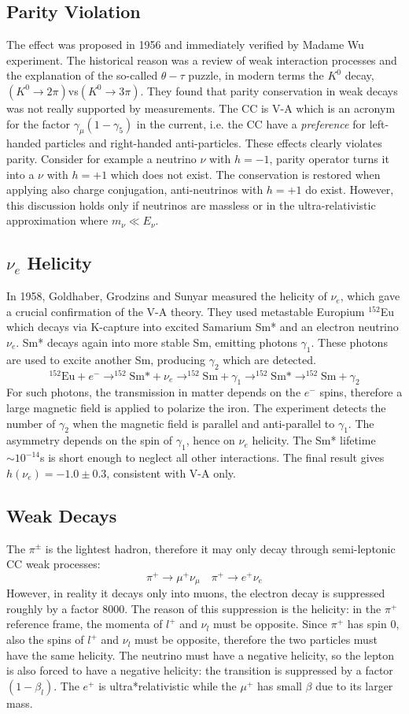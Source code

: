 \documentclass[10.75pt,a4paper,openright,bottom=2cm]{article}
\begin{document}
\subsection{Parity Violation}
The effect was proposed in 1956 and immediately verified by Madame Wu experiment. The historical reason was a review of weak interaction processes and the explanation of the so-called $\theta-\tau$ puzzle, in modern terms the $K^0$ decay,\\
$(K^0\to2\pi)$vs$(K^0\to3\pi)$. They found that parity conservation in weak decays was not really supported by measurements. The CC is V-A which is an acronym for the factor $\gamma_\mu(1-\gamma_5)$ in the current, i.e. the CC have a \textit{preference} for left-handed particles and right-handed anti-particles. These effects clearly violates parity. Consider for example a neutrino $\nu$ with $h=-1$, parity operator turns it into a $\nu$ with $h=+1$ which does not exist. The conservation is restored when applying also charge conjugation, anti-neutrinos with $h=+1$ do exist. However, this discussion holds only if neutrinos are massless or in the ultra-relativistic approximation where $m_\nu\ll E_\nu$.
\subsection{$\nu_e$ Helicity}
In 1958, Goldhaber, Grodzins and Sunyar measured the helicity of $\nu_e$, which gave a crucial confirmation of the V-A theory. They used metastable Europium $^{152}$Eu which decays via K-capture into excited Samarium Sm* and an electron neutrino $\nu_e$. Sm* decays again into more stable Sm, emitting photons $\gamma_1$. These photons are used to excite another Sm, producing $\gamma_2$ which are detected. 
\[
^{152}\text{Eu}+e^-\to^{152}\text{Sm*}+\nu_e\to^{152}\text{Sm}+\gamma_1\to^{152}\text{Sm*}\to^{152}\text{Sm}+\gamma_2
\]
For such photons, the transmission in matter depends on the $e^-$ spins, therefore a large magnetic field is applied to polarize the iron. The experiment detects the number of $\gamma_2$ when the magnetic field is parallel and anti-parallel to $\gamma_1$. The asymmetry depends on the spin of $\gamma_1$, hence on $\nu_e$ helicity. The Sm* lifetime $\sim10^{-14}$\;s is short enough to neglect all other interactions. The final result gives $h(\nu_e)=-1.0\pm0.3$, consistent with V-A only.
\subsection{Weak Decays}
The $\pi^\pm$ is the lightest hadron, therefore it may only decay through semi-leptonic CC weak processes:
\[
\pi^+\to\mu^+\nu_\mu \quad \pi^+\to e^+\nu_e
\]
However, in reality it decays only into muons, the electron decay is suppressed roughly by a factor 8000. The reason of this suppression is the helicity: in the $\pi^+$ reference frame, the momenta of $l^+$ and $\nu_l$ must be opposite. Since $\pi^+$ has spin 0, also the spins of $l^+$ and $\nu_l$ must be opposite, therefore the two particles must have the same helicity. The neutrino must have a negative helicity, so the lepton is also forced to have a negative helicity: the transition is suppressed by a factor $(1-\beta_l)$. The $e^+$ is ultra*relativistic while the $\mu^+$ has small $\beta$ due to its larger mass.
\end{document}
